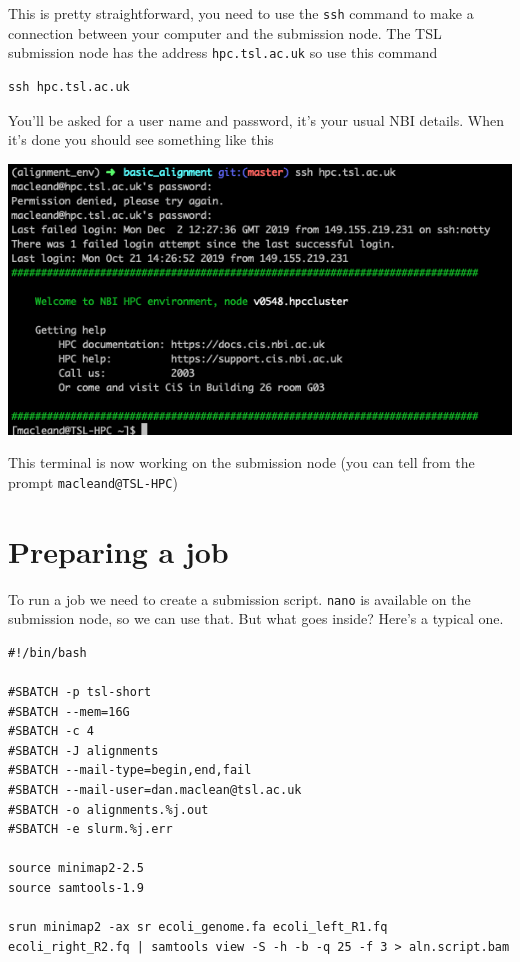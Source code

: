 \documentclass[]{book}
\begin{document}
This is pretty straightforward, you need to use the \texttt{ssh} command to make a connection between your computer and the submission node. The TSL submission node has the address \texttt{hpc.tsl.ac.uk} so use this command

\begin{verbatim}
ssh hpc.tsl.ac.uk
\end{verbatim}

You'll be asked for a user name and password, it's your usual NBI details. When it's done you should see something like this

\includegraphics{login.png}

This terminal is now working on the submission node (you can tell from the prompt \texttt{macleand@TSL-HPC})

\hypertarget{preparing-a-job}{%
\section{Preparing a job}\label{preparing-a-job}}

To run a job we need to create a submission script. \texttt{nano} is available on the submission node, so we can use that. But what goes inside? Here's a typical one.

\begin{verbatim}
#!/bin/bash

#SBATCH -p tsl-short
#SBATCH --mem=16G
#SBATCH -c 4
#SBATCH -J alignments
#SBATCH --mail-type=begin,end,fail
#SBATCH --mail-user=dan.maclean@tsl.ac.uk
#SBATCH -o alignments.%j.out
#SBATCH -e slurm.%j.err

source minimap2-2.5
source samtools-1.9

srun minimap2 -ax sr ecoli_genome.fa ecoli_left_R1.fq ecoli_right_R2.fq | samtools view -S -h -b -q 25 -f 3 > aln.script.bam
\end{verbatim}
\end{document}
